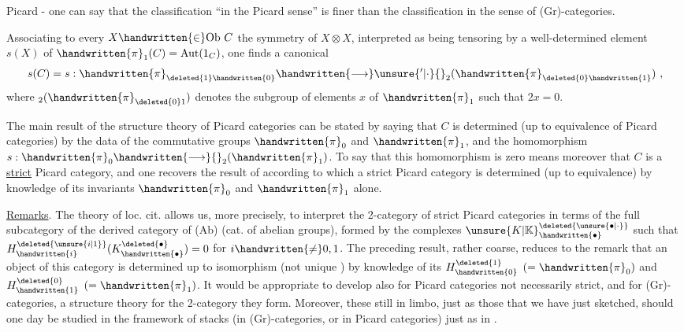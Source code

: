 
Picard - one can say that the classification ``in the Picard sense'' is finer than the classification in the sense of (Gr)-categories. 

Associating to every $X\handwritten{\in}\mathrm{Ob}\ C$ the symmetry of $X\otimes X$, interpreted as  being tensoring by a well-determined element $s(X)$ of $\handwritten{\pi}_{1}(C)=\mathrm{Aut}(1_C)$, one finds a canonical 
\[
s(C)=s:\handwritten{\pi}_{\deleted{1}\handwritten{0}}\handwritten{\longrightarrow}\unsure{{}'|\cdot}{}_{2}(\handwritten{\pi}_{\deleted{0}\handwritten{1}})\ ,
\]
where $ {}_{2}(\handwritten{\pi}_{\deleted{0}1})$ denotes the subgroup of elements $x$ of $\handwritten{\pi}_{1}$ such that $2x=0$.

The main result of the structure theory of Picard categories can be stated by saying that $C$ is determined (up to  equivalence of Picard categories) by the data of the commutative groups $\handwritten{\pi}_{0}$ and $\handwritten{\pi}_{1}$, and the homomorphism $s:\handwritten{\pi}_{0}\handwritten{\longrightarrow}{}_{2}(\handwritten{\pi}_{1})$. To say that this homomorphism is zero means moreover that $C$ is a \uline{strict} Picard category, and one recovers the result of \handwritten{[\, ]} according to which a strict Picard category is determined (up to equivalence) by knowledge of its invariants $\handwritten{\pi}_{0}$ and $\handwritten{\pi}_{1}$ alone.

\uline{Remarks}. The theory of loc. cit. allows us, more precisely, to interpret the 2-category of strict Picard categories in terms of the full subcategory of the derived category of (Ab) (cat. of abelian groups), formed by the complexes ${\unsure{K|\mathbb{K}}}^{\deleted{\unsure{\bullet|\cdot}}}_{\handwritten{\bullet}}$ such that $H^{\deleted{\unsure{i|1}}}_{\handwritten{i}}(K^{\deleted{\bullet}}_{\handwritten{\bullet}})=0$ for $i\handwritten{\ne}0,1$. The preceding result, rather coarse, reduces  to the remark that an object of this category is determined up to isomorphism (not unique \handwritten{!}) by knowledge of its $H^{\deleted{1}}_{\handwritten{0}}$ $(=\handwritten{\pi}_{0})$ and $H^{\deleted{0}}_{\handwritten{1}}$ $(=\handwritten{\pi}_{1})$. It would be appropriate to develop also for Picard categories not necessarily strict, and for (Gr)-categories, a structure theory for the 2-category they form. Moreover, these  still in limbo, just as those that  we have just sketched, should one day be  studied in the framework of stacks (in (Gr)-categories, or in Picard categories) just as in  \handwritten{[\, ]}.

